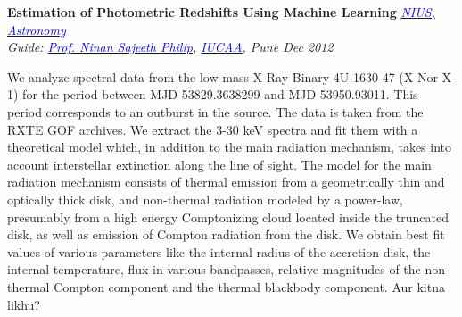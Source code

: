 \documentclass[margin,line]{res}
\newenvironment{list1}{
  \begin{list}{\ding{113}}{%
      \setlength{\itemsep}{0in}
      \setlength{\parsep}{0in} \setlength{\parskip}{0in}
      \setlength{\topsep}{0in} \setlength{\partopsep}{0in} 
      \setlength{\leftmargin}{0.17in}}}{\end{list}}
\begin{document}
\begin{resume}
\vspace*{-0.1in}

{\bf Estimation of Photometric Redshifts Using Machine Learning} \hfill \textit{\href{http://nius.hbcse.tifr.res.in/}{\textcolor{blue} {NIUS, Astronomy}}} \\
{\em Guide: \href{http://www.iucaa.ernet.in/~nspp/}{\textcolor{blue}{Prof. Ninan Sajeeth Philip}}, \href{http://www.iucaa.ernet.in/}{\textcolor{blue} {IUCAA}}, Pune \hfill Dec 2012} \\
\vspace*{-.15in}
\begin{list1}
\item[] We analyze spectral data from the low-mass X-Ray Binary 4U 1630-47 (X Nor X-1) for the period between MJD 53829.3638299 and MJD 53950.93011. This period corresponds to an outburst in the source. The data is taken from the RXTE GOF archives. We extract the 3-30 keV spectra and fit them with a theoretical model which, in addition to the main radiation mechanism, takes into account interstellar extinction along the line of sight. The model for the main radiation mechanism consists of thermal emission from a geometrically thin and optically thick disk, and non-thermal radiation modeled by a power-law, presumably from a high energy Comptonizing cloud located inside the truncated disk, as well as emission of Compton radiation from the disk. We obtain best fit values of various parameters like the internal radius of the accretion disk, the internal temperature, flux in various bandpasses, relative magnitudes of the non-thermal Compton component and the thermal blackbody component. Aur kitna likhu?
\end{list1}


\end{resume}
\end{document}
